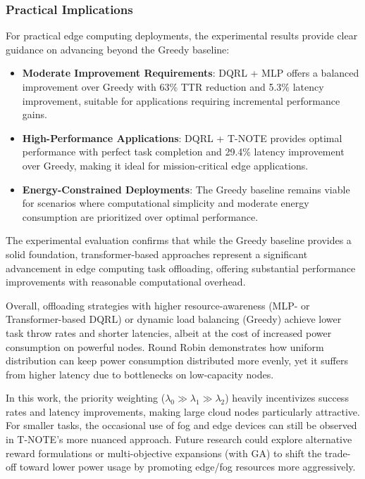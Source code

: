 \documentclass[preprint,12pt]{elsarticle}
\begin{document}
\subsubsection{Practical Implications}

For practical edge computing deployments, the experimental results provide clear guidance on advancing beyond the Greedy baseline:

\begin{itemize}
    \item \textbf{Moderate Improvement Requirements}: DQRL + MLP offers a balanced improvement over Greedy with 63\% TTR reduction and 5.3\% latency improvement, suitable for applications requiring incremental performance gains.
    \item \textbf{High-Performance Applications}: DQRL + T-NOTE provides optimal performance with perfect task completion and 29.4\% latency improvement over Greedy, making it ideal for mission-critical edge applications.
    \item \textbf{Energy-Constrained Deployments}: The Greedy baseline remains viable for scenarios where computational simplicity and moderate energy consumption are prioritized over optimal performance.
\end{itemize}

The experimental evaluation confirms that while the Greedy baseline provides a solid foundation, transformer-based approaches represent a significant advancement in edge computing task offloading, offering substantial performance improvements with reasonable computational overhead.

Overall, offloading strategies with higher resource-awareness (MLP- or Transformer-based DQRL) or dynamic load balancing (Greedy) achieve lower task throw rates and shorter latencies, albeit at the cost of increased power consumption on powerful nodes. Round Robin demonstrates how uniform distribution can keep power consumption distributed more evenly, yet it suffers from higher latency due to bottlenecks on low-capacity nodes.

In this work, the priority weighting (\(\lambda_0 \gg \lambda_1 \gg \lambda_2\)) heavily incentivizes success rates and latency improvements, making large cloud nodes particularly attractive. For smaller tasks, the occasional use of fog and edge devices can still be observed in T-NOTE’s more nuanced approach. Future research could explore alternative reward formulations or multi-objective expansions (with GA) to shift the trade-off toward lower power usage by promoting edge/fog resources more aggressively.
\end{document}
